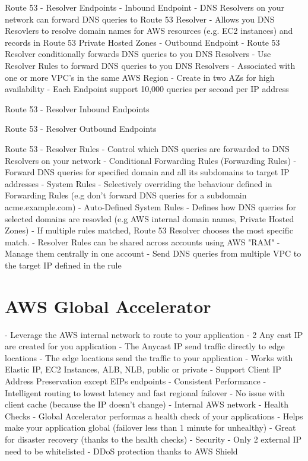 \documentclass[11pt]{book}
\begin{document}
    Route 53 - Resolver Endpoints
    - Inbound Endpoint
        - DNS Resolvers on your network can forward DNS queries to Route 53 Resolver
        - Allows you DNS Resovlers to resolve domain names for AWS resources (e.g. EC2 instances) and records in Route 53 Private Hosted Zones
    - Outbound Endpoint
        - Route 53 Resolver conditionally forwards DNS queries to you DNS Resolvers
        - Use Resolver Rules to forward DNS queries to you DNS Resolvers
    - Associated with one or more VPC's in the same AWS Region
    - Create in two AZs for high availability
    - Each Endpoint support 10,000 queries per second per IP address

    Route 53 - Resolver Inbound Endpoints

    Route 53 - Resolver Outbound Endpoints

    Route 53 - Resolver Rules
    - Control which DNS queries are forwarded to DNS Resolvers on your network
    - Conditional Forwarding Rules (Forwarding Rules)
        - Forward DNS queries for specified domain and all its subdomains to target IP addresses
    - System Rules
        - Selectively overriding the behaviour defined in Forwarding Rules (e.g don't forward DNS queries for a subdomain acme.example.com)
    - Auto-Defined System Rules
        - Defines how DNS queries for selected domains are resovled (e.g AWS internal domain names, Private Hosted Zones)
    - If multiple rules matched, Route 53 Resolver chooses the most specific match.
    - Resolver Rules can be shared across accounts using AWS "RAM"
        - Manage them centrally in one account
        - Send DNS queries from multiple VPC to the target IP defined in the rule

    \section{AWS Global Accelerator}
    - Leverage the AWS internal network to route to your application
    - 2 Any cast IP are created for you application
    - The Anycast IP send traffic directly to edge locations
    - The edge locations send the traffic to your application
    - Works with Elastic IP, EC2 Instances, ALB, NLB, public or private
    - Support Client IP Address Preservation except EIPs endpoints
    - Consistent Performance
        - Intelligent routing to lowest latency and fast regional failover
        - No issue with client cache (because the IP doesn't change)
        - Internal AWS network
    - Health Checks
        - Global Accelerator performas a health check of your applications
        - Helps make your application global (failover less than 1 minute for unhealthy)
        - Great for disaster recovery (thanks to the health checks)
    - Security
        - Only 2 external IP need to be whitelisted
        - DDoS protection thanks to AWS Shield
\end{document}

